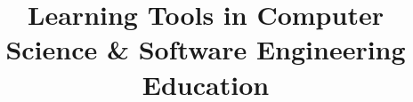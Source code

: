 \documentclass{report}
\begin{document}
\title{Learning Tools in Computer Science & Software Engineering Education}

  \author{
}

\maketitle

\tableofcontents


\end{document}
